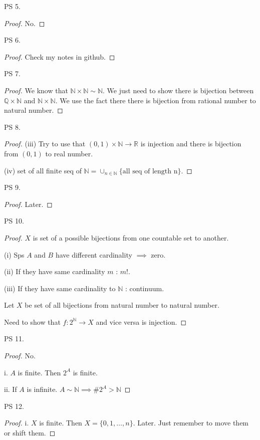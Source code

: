 \documentclass[a4paper]{article}
\newcommand{\R}{\mathbb{R}}
\newcommand{\N}{\mathbb{N}}
\newcommand{\Q}{\mathbb{Q}}
\begin{document}
PS 5.
\begin{proof}
	No.
\end{proof}

PS 6.
\begin{proof}
	Check my notes in github.	
\end{proof}

PS 7. 
\begin{proof}
	We know that $\N \times \N \sim \N$. We just need to show there is bijection between $\Q \times \N$ and $\N \times \N$. We use the fact there there is bijection from rational number to natural number.
\end{proof}

PS 8.
\begin{proof}
	(iii) Try to use that $\left( 0, 1 \right) \times \N \to \R$ is injection and there is bijection from $\left( 0,1 \right) $ to real number.

	(iv) set of all finite seq of $\N = \cup_{n \in \N} \{ \text{all seq of length n}\}$.
\end{proof}

PS 9.
\begin{proof}
	Later.
\end{proof}

PS 10.
\begin{proof}
	$X$ is set of a possible bijections from one countable set to another.

	(i) Sps $A$ and $B$ have different cardinality $\implies$ zero.

	(ii) If they have same cardinality $m$ : $m!$.

	(iii) If they have same cardinality to  $\N$ : continuum.

	Let $X$ be set of all bijections from natural number to natural number.

	Need to show that $f: 2^{\N} \to X$ and vice versa is injection.
\end{proof}

PS 11.
\begin{proof}
	No. 

	i. $A$ is finite. Then $2^{A}$ is finite.

	ii. If $A$ is infinite. $A\sim \N \implies \# 2^{A} > \N$
\end{proof}

PS 12.
\begin{proof}
	i. $X$ is finite. Then $X = \{0, 1, \ldots, n\}$.
	Later. Just remember to move them or shift them.
\end{proof}
\end{document}
